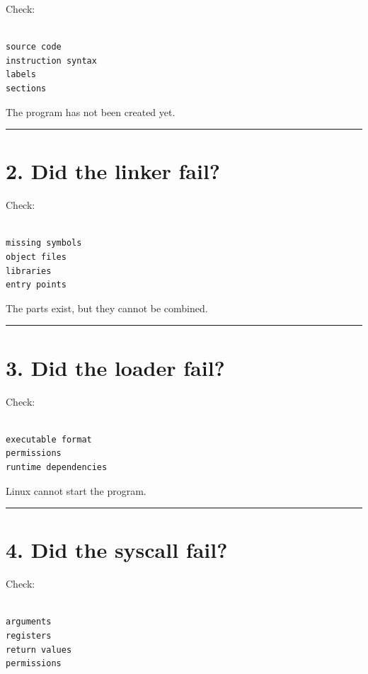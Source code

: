 \documentclass[
  oneside,
  openany]{book}
\begin{document}
Check:

\begin{verbatim}

source code
instruction syntax
labels
sections
\end{verbatim}

The program has not been created yet.

\begin{center}\rule{0.5\linewidth}{0.5pt}\end{center}

\hypertarget{did-the-linker-fail}{%
\section{2. Did the linker fail?}\label{did-the-linker-fail}}

Check:

\begin{verbatim}

missing symbols
object files
libraries
entry points
\end{verbatim}

The parts exist, but they cannot be combined.

\begin{center}\rule{0.5\linewidth}{0.5pt}\end{center}

\hypertarget{did-the-loader-fail}{%
\section{3. Did the loader fail?}\label{did-the-loader-fail}}

Check:

\begin{verbatim}

executable format
permissions
runtime dependencies
\end{verbatim}

Linux cannot start the program.

\begin{center}\rule{0.5\linewidth}{0.5pt}\end{center}

\hypertarget{did-the-syscall-fail}{%
\section{4. Did the syscall fail?}\label{did-the-syscall-fail}}

Check:

\begin{verbatim}

arguments
registers
return values
permissions
\end{verbatim}
\end{document}
